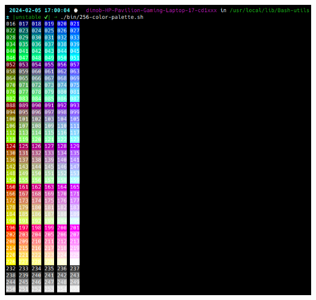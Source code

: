 \documentclass[a4paper,10pt]{article}
\begin{document}
    \begin{justify}
    	\includegraphics[scale=0.5884]{../../00 DATA/img/XTERM palette table.png}
    \end{justify}




\end{document}
